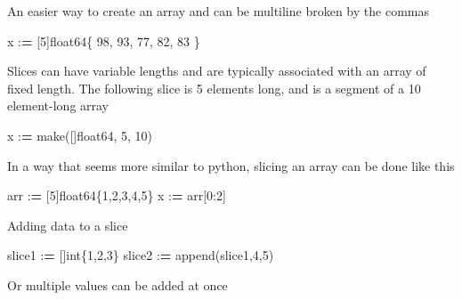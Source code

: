 \documentclass[]{book}
\newenvironment{Shaded}{\begin{snugshade}}{\end{snugshade}}
\newcommand{\BuiltInTok}[1]{#1}
\newcommand{\DecValTok}[1]{\textcolor[rgb]{0.00,0.00,0.81}{#1}}
\newcommand{\NormalTok}[1]{#1}
\newcommand{\OperatorTok}[1]{\textcolor[rgb]{0.81,0.36,0.00}{\textbf{#1}}}
\begin{document}
An easier way to create an array and can be multiline broken by the commas

\begin{Shaded}
\begin{Highlighting}[]
\NormalTok{x :}\OperatorTok{=}\NormalTok{ [}\DecValTok{5}\NormalTok{]float64\{ }\DecValTok{98}\NormalTok{, }\DecValTok{93}\NormalTok{, }\DecValTok{77}\NormalTok{, }\DecValTok{82}\NormalTok{, }\DecValTok{83}\NormalTok{ \}}
\end{Highlighting}
\end{Shaded}

Slices can have variable lengths and are typically associated with an array of fixed length. The following slice is 5 elements long, and is a segment of a 10 element-long array

\begin{Shaded}
\begin{Highlighting}[]
\NormalTok{x :}\OperatorTok{=}\NormalTok{ make([]float64, }\DecValTok{5}\NormalTok{, }\DecValTok{10}\NormalTok{)}
\end{Highlighting}
\end{Shaded}

In a way that seems more similar to python, slicing an array can be done like this

\begin{Shaded}
\begin{Highlighting}[]
\NormalTok{arr :}\OperatorTok{=}\NormalTok{ [}\DecValTok{5}\NormalTok{]float64\{}\DecValTok{1}\NormalTok{,}\DecValTok{2}\NormalTok{,}\DecValTok{3}\NormalTok{,}\DecValTok{4}\NormalTok{,}\DecValTok{5}\NormalTok{\}}
\NormalTok{x :}\OperatorTok{=}\NormalTok{ arr[}\DecValTok{0}\NormalTok{:}\DecValTok{2}\NormalTok{]}
\end{Highlighting}
\end{Shaded}

Adding data to a slice

\begin{Shaded}
\begin{Highlighting}[]
\NormalTok{slice1 :}\OperatorTok{=}\NormalTok{ []}\BuiltInTok{int}\NormalTok{\{}\DecValTok{1}\NormalTok{,}\DecValTok{2}\NormalTok{,}\DecValTok{3}\NormalTok{\}}
\NormalTok{slice2 :}\OperatorTok{=}\NormalTok{ append(slice1,}\DecValTok{4}\NormalTok{,}\DecValTok{5}\NormalTok{)}
\end{Highlighting}
\end{Shaded}

Or multiple values can be added at once
\end{document}

